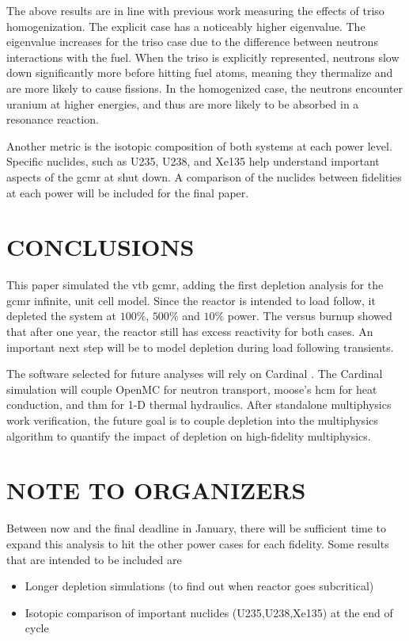 \documentclass[letterpaper]{physor2024}
\begin{document}
The above results are in line with previous work measuring the effects of \gls{triso} homogenization. The explicit case has a noticeably higher eigenvalue. The eigenvalue increases for the \gls{triso} case due to the difference between neutrons interactions with the fuel. When the \gls{triso} is explicitly represented, neutrons slow down significantly more before hitting fuel atoms, meaning they thermalize and are more likely to cause fissions. In the homogenized case, the neutrons encounter uranium at higher energies, and thus are more likely to be absorbed in a resonance reaction.

Another metric is the isotopic composition of both systems at each power level. Specific nuclides, such as U235, U238, and Xe135 help understand important aspects of the \gls{gcmr} at shut down. A comparison of the nuclides between fidelities at each power will be included for the final paper.

\section{CONCLUSIONS}\label{sec:conclusions}
This paper simulated the \gls{vtb} \gls{gcmr}, adding the first depletion analysis for the \gls{gcmr} infinite, unit cell model. Since the reactor is intended to load follow, it depleted the system at $100\%$, $500\%$ and $10\%$ power. The \kinf versus burnup showed that after one year, the reactor still has excess reactivity for both cases. An important next step will be to model depletion during load following transients.

The software selected for future analyses will rely on Cardinal \cite{novak2022-cardinal}. The Cardinal simulation will couple OpenMC for neutron transport, \gls{moose}'s \gls{hcm} for heat conduction, and \gls{thm} for 1-D thermal hydraulics. After standalone multiphysics work verification, the future goal is to couple depletion into the multiphysics algorithm to quantify the impact of depletion on high-fidelity multiphysics.

\section*{NOTE TO ORGANIZERS}
Between now and the final deadline in January, there will be sufficient time to expand this analysis to hit the other power cases for each fidelity. Some results that are intended to be included are
\begin{itemize}
    \item Longer depletion simulations (to find out when reactor goes subcritical)
    \item Isotopic comparison of important nuclides (U235,U238,Xe135) at the end of cycle
\end{itemize}
\end{document}
